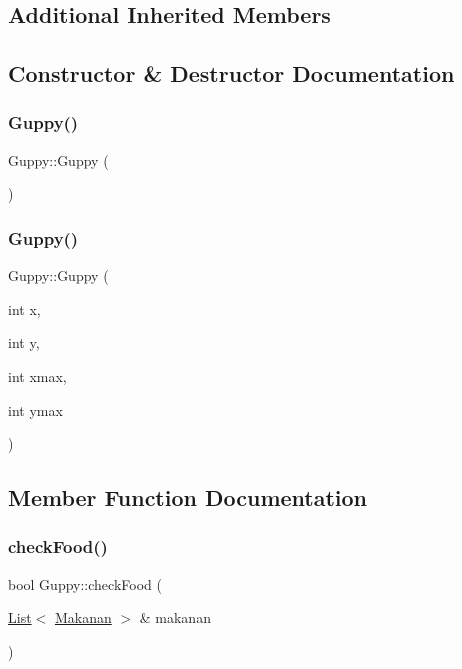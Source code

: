 \subsection*{Additional Inherited Members}


\subsection{Constructor \& Destructor Documentation}
\mbox{\label{class_guppy_aa78f8b5323b1015c968a8edab52773f5}} 
\subsubsection{\texorpdfstring{Guppy()}{Guppy()}\hspace{0.1cm}{\footnotesize\ttfamily [1/2]}}
{\footnotesize\ttfamily Guppy\+::\+Guppy (\begin{DoxyParamCaption}{ }\end{DoxyParamCaption})}

\mbox{\label{class_guppy_a887d984014e34e1ea918b39c5698ee42}} 
\subsubsection{\texorpdfstring{Guppy()}{Guppy()}\hspace{0.1cm}{\footnotesize\ttfamily [2/2]}}
{\footnotesize\ttfamily Guppy\+::\+Guppy (\begin{DoxyParamCaption}\item[{int}]{x,  }\item[{int}]{y,  }\item[{int}]{xmax,  }\item[{int}]{ymax }\end{DoxyParamCaption})}



\subsection{Member Function Documentation}
\mbox{\label{class_guppy_a34ca887a2c2ff3b3fba494d0abd31bda}} 
\subsubsection{\texorpdfstring{check\+Food()}{checkFood()}}
{\footnotesize\ttfamily bool Guppy\+::check\+Food (\begin{DoxyParamCaption}\item[{\mbox{\hyperlink{class_list}{List}}$<$ \mbox{\hyperlink{class_makanan}{Makanan}} $>$ \&}]{makanan }\end{DoxyParamCaption})}

